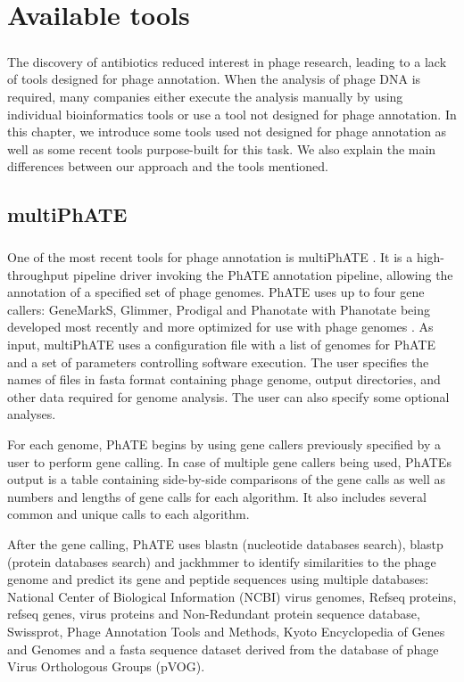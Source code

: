 \chapter{Available tools}

\label{kap:avtools} %
\paragraph*{}
The discovery of antibiotics reduced interest in phage research, leading to a lack of tools designed for phage annotation. When the analysis of phage DNA is required, many companies either execute the analysis manually by using individual bioinformatics tools or use a tool not designed for phage annotation. In this chapter, we introduce some tools used not designed for phage annotation as well as some recent tools purpose-built for this task. We also explain the main differences between our approach and the tools mentioned.
\section{multiPhATE}
\paragraph*{}
One of the most recent tools for phage annotation is multiPhATE \cite{10.1093/bioinformatics/btz258}. It is a high-throughput pipeline driver invoking the PhATE annotation pipeline, allowing the annotation of a specified set of phage genomes. PhATE uses up to four gene callers: GeneMarkS, Glimmer, Prodigal and Phanotate with Phanotate being developed most recently and more optimized for use with phage genomes \cite{10.1093/bioinformatics/btz265}.
As input, multiPhATE uses a configuration file with a list of genomes for PhATE and a set of parameters controlling software execution. The user specifies the names of files in fasta format containing phage genome, output directories, and other data required for genome analysis. The user can also specify some optional analyses.

For each genome, PhATE begins by using gene callers previously specified by a user to perform gene calling. In case of multiple gene callers being used, PhATEs output is a table containing side-by-side comparisons of the gene calls as well as numbers and lengths of gene calls for each algorithm. It also includes several common and unique calls to each algorithm. 

After the gene calling, PhATE uses blastn (nucleotide databases search), blastp (protein databases search) and jackhmmer to identify similarities to the phage genome and predict its gene and peptide sequences using multiple databases: National Center of Biological Information (NCBI) virus genomes, Refseq proteins, refseq genes, virus proteins and Non-Redundant protein sequence database, Swissprot, Phage Annotation Tools and Methods, Kyoto Encyclopedia of Genes and Genomes and a fasta sequence dataset derived from the database of phage Virus Orthologous Groups (pVOG).

